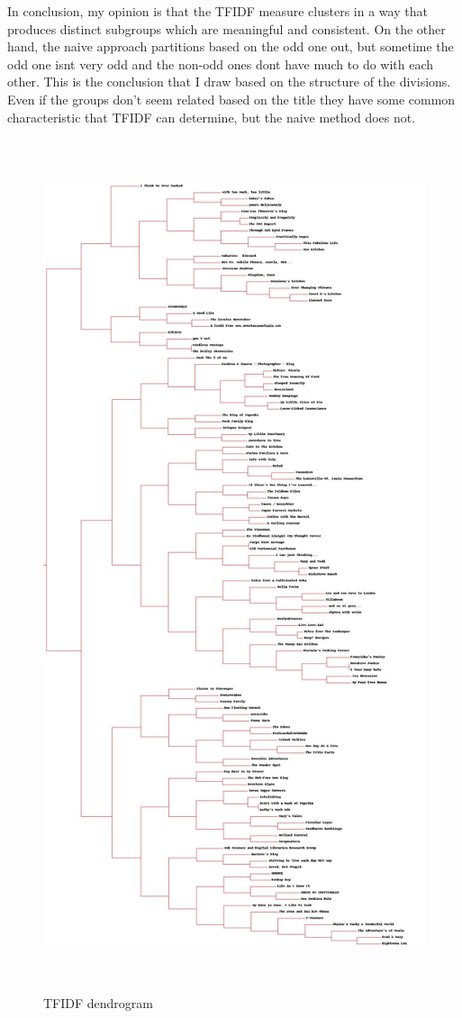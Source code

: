 In conclusion, my opinion is that the TFIDF measure clusters in a way that produces distinct subgroups which are meaningful and consistent. On the other hand, the naive approach partitions based on the odd one out, but sometime the odd one isnt very odd and the non-odd ones dont have much to do with each other. This is the conclusion that I draw based on the structure of the divisions. Even if the groups don't seem related based on the title they have some common characteristic that TFIDF can determine, but the naive method does not.








\begin{figure}[h!]
\centering
\includegraphics[height=25cm]{../qec/blogdendro}
\caption{TFIDF dendrogram}
\end{figure}






